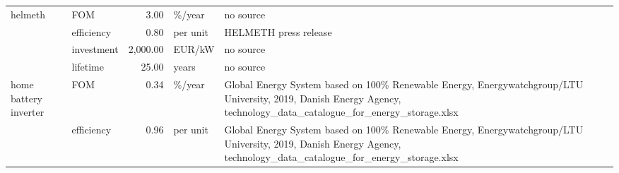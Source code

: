 \begin{longtable}{p{5cm}p{3cm}rp{3cm}p{11cm}}
helmeth & FOM &           3.00 &                            \%/year &                                                                                                                                                                                                                                                                                                                            no source \\
                      & efficiency &           0.80 &                          per unit &                                                                                                                                                                                                                                                                                                                HELMETH press release \\
                      & investment &       2,000.00 &                            EUR/kW &                                                                                                                                                                                                                                                                                                                            no source \\
                      & lifetime &          25.00 &                             years &                                                                                                                                                                                                                                                                                                                            no source \\
home battery inverter & FOM &           0.34 &                            \%/year &                                                                                                                                                                  Global Energy System based on 100\% Renewable Energy, Energywatchgroup/LTU University, 2019, Danish Energy Agency, technology\_data\_catalogue\_for\_energy\_storage.xlsx \\
                      & efficiency &           0.96 &                          per unit &                                                                                                                                                                  Global Energy System based on 100\% Renewable Energy, Energywatchgroup/LTU University, 2019, Danish Energy Agency, technology\_data\_catalogue\_for\_energy\_storage.xlsx \\

\end{longtable}
